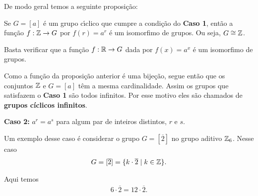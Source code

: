 De modo geral temos a seguinte proposição:

\begin{proposicao}
    Se $G = [a]$ \'e um grupo c{\'\i}clico que cumpre a condi\c{c}\~ao do \textbf{Caso 1}, ent\~ao a fun\c{c}\~ao $f : \mathbb{Z} \to G$ por $f(r) = a^r$ \'e um isomorfimo de grupos. Ou seja, $G \cong \mathbb{Z}$.
\end{proposicao}
\begin{prova}
	Basta verificar que a função $f : \mathbb{R} \to G$ dada por $f(x) = a^x$ é um isomorfimo de grupos.
\end{prova}

\begin{observacao}
	Como a função da proposição anterior é uma bijeção, segue então que os conjuntos $\mathbb{Z}$ e $G = [a]$ têm a mesma cardinalidade. Assim os grupos que satisfazem o \textbf{Caso 1} são todos infinitos. Por esse motivo eles são chamados de \textbf{grupos cíclicos infinitos}.
\end{observacao}

\textbf{Caso 2:} $a^r = a^s$ para algum par de inteiros distintos, $r$ e $s$.

Um exemplo desse caso é considerar o grupo $G = [\overline{2}]$ no grupo aditivo $\mathbb{Z}_6$. Nesse caso
\begin{align*}
	G = [\overline{2}] = \{k \cdot \overline{2} \mid k \in \mathbb{Z}\}.
\end{align*}

Aqui temos
\begin{align*}
	6\cdot\overline{2} = 12\cdot \overline{2}.
\end{align*}

